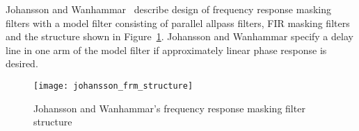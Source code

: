 \documentclass[a4paper,twoside,10pt,english]{report}
\begin{document}
Johansson and
Wanhammar~\cite{JohanssonWanhammar_RecursiveDigitalFiltersFrequencyMasking}
describe design of frequency response masking filters with a model filter
consisting of parallel allpass filters, FIR masking filters and the structure
shown in 
Figure~\ref{fig:Johansson-and-Wanhammar-frequency-response-masking-structure}.
Johansson and Wanhammar specify a delay line in one arm of the model filter
if approximately linear phase response is desired.
\begin{figure}[!htbp]
\begin{center}
\texttt{[image: johansson\_frm\_structure]}
\caption{Johansson and Wanhammar's frequency response masking filter structure}
\label{fig:Johansson-and-Wanhammar-frequency-response-masking-structure}
\end{center}
\end{figure}
\end{document}
